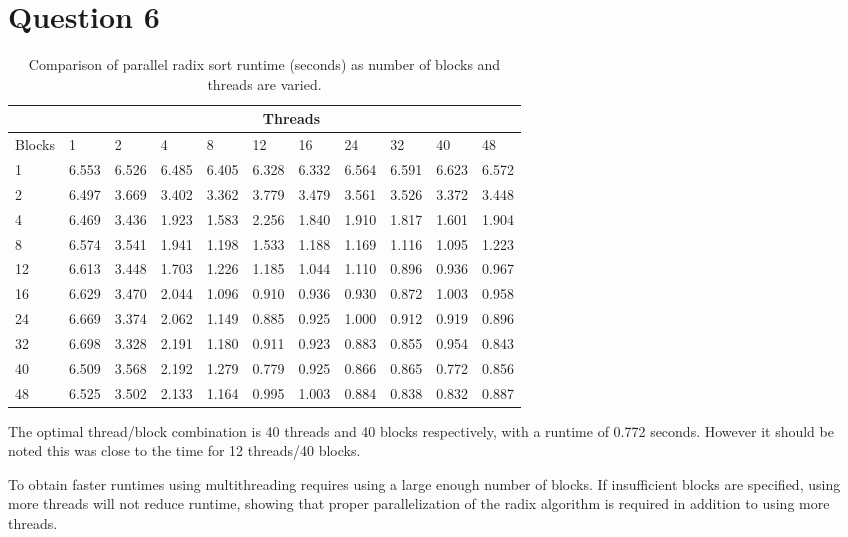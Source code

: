 \section{Question 6}
\begin{table}[!ht]
	\centering
	\caption{Comparison of parallel radix sort runtime (seconds) as number of blocks and threads are varied.}
	\begin{tabular}{l|llllllllll}
		    & \multicolumn{10}{c}{Threads} \\
		    \hline
		   Blocks&      1  &     2  &    4   &    8   &   12   &    16   &   24   &   32  &   40    &    48 \\
		   \hline
		   1  &  6.553  & 6.526  & 6.485  & 6.405  &  6.328  & 6.332  & 6.564  & 6.591 &  6.623  &  6.572 \\
		   2  &  6.497  & 3.669  & 3.402  & 3.362  &  3.779  & 3.479  & 3.561  & 3.526 &  3.372  &  3.448\\
		   4  &  6.469  & 3.436  & 1.923  & 1.583  &  2.256  & 1.840  & 1.910  & 1.817 &  1.601  &  1.904\\
		   8  &  6.574  & 3.541  & 1.941  & 1.198  &  1.533  & 1.188  & 1.169  & 1.116 &  1.095  &  1.223\\
		   12 &   6.613 &  3.448 &  1.703 &  1.226 &   1.185 &  1.044 &  1.110 &  0.896&   0.936 &   0.967\\
		   16 &   6.629 &  3.470 &  2.044 &  1.096 &   0.910 &  0.936 &  0.930 &  0.872&   1.003 &   0.958\\
		   24 &   6.669 &  3.374 &  2.062 &  1.149 &   0.885 &  0.925 &  1.000 &  0.912&   0.919 &   0.896\\
		   32 &   6.698 &  3.328 &  2.191 &  1.180 &  0.911  & 0.923  & 0.883  & 0.855 &  0.954  &  0.843\\
		   40 &   6.509 &  3.568 &  2.192 &  1.279 &   0.779 &  0.925 &  0.866 &  0.865&   0.772 &   0.856\\
		   48 &   6.525 &  3.502 &  2.133 &  1.164 &   0.995 &  1.003 &  0.884 &  0.838&   0.832 &   0.887\\ 
	\end{tabular}
	\label{tab:threadblock}
\end{table}

The optimal thread/block combination is 40 threads and 40 blocks respectively, with a runtime of 0.772 seconds. However it should be noted this was close to the time for 12 threads/40 blocks.

To obtain faster runtimes using multithreading requires using a large enough number of blocks. If insufficient blocks are specified, using more threads will not reduce runtime, showing that proper parallelization of the radix algorithm is required in addition to using more threads.